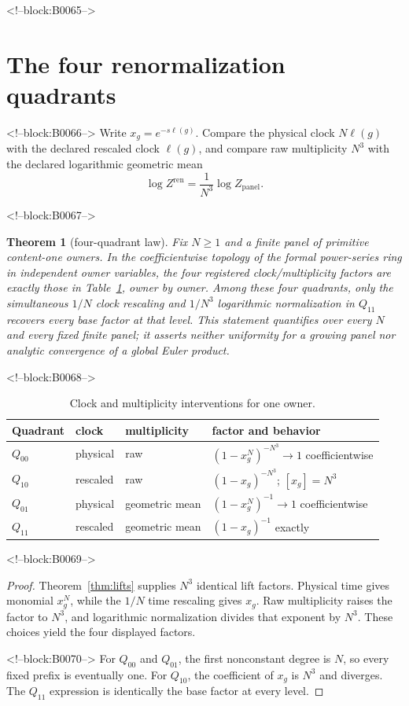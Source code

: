 \documentclass[11pt]{article}
\newtheorem{theorem}{Theorem}[section]
\theoremstyle{definition}
\theoremstyle{remark}
\begin{document}
<!--block:B0065-->
\section{The four renormalization quadrants}

<!--block:B0066-->
Write $x_g=e^{-s\ell(g)}$. Compare the physical clock $N\ell(g)$ with the declared rescaled clock $\ell(g)$, and compare raw multiplicity $N^3$ with the declared logarithmic geometric mean
\[
\log Z^{\mathrm{ren}}=\frac1{N^3}\log Z_{\mathrm{panel}}.
\]

<!--block:B0067-->
\begin{theorem}[four-quadrant law]\label{thm:quadrants}
Fix $N\geq1$ and a finite panel of primitive content-one owners. In the coefficientwise topology of the formal power-series ring in independent owner variables, the four registered clock/multiplicity factors are exactly those in Table~\ref{tab:quadrants}, owner by owner. Among these four quadrants, only the simultaneous $1/N$ clock rescaling and $1/N^3$ logarithmic normalization in $Q_{11}$ recovers every base factor at that level. This statement quantifies over every $N$ and every fixed finite panel; it asserts neither uniformity for a growing panel nor analytic convergence of a global Euler product.
\end{theorem}

<!--block:B0068-->
\begin{table}[ht]
\centering
\caption{Clock and multiplicity interventions for one owner.}
\label{tab:quadrants}
\begin{tabular}{llll}
\toprule
Quadrant & clock & multiplicity & factor and behavior\\
\midrule
$Q_{00}$ & physical & raw & $(1-x_g^N)^{-N^3}\to1$ coefficientwise\\
$Q_{10}$ & rescaled & raw & $(1-x_g)^{-N^3}$; $[x_g]=N^3$\\
$Q_{01}$ & physical & geometric mean & $(1-x_g^N)^{-1}\to1$ coefficientwise\\
$Q_{11}$ & rescaled & geometric mean & $(1-x_g)^{-1}$ exactly\\
\bottomrule
\end{tabular}
\end{table}

<!--block:B0069-->
\begin{proof}
Theorem~\ref{thm:lifts} supplies $N^3$ identical lift factors. Physical time gives monomial $x_g^N$, while the $1/N$ time rescaling gives $x_g$. Raw multiplicity raises the factor to $N^3$, and logarithmic normalization divides that exponent by $N^3$. These choices yield the four displayed factors.

<!--block:B0070-->
For $Q_{00}$ and $Q_{01}$, the first nonconstant degree is $N$, so every fixed prefix is eventually one. For $Q_{10}$, the coefficient of $x_g$ is $N^3$ and diverges. The $Q_{11}$ expression is identically the base factor at every level.
\end{proof}
\end{document}
